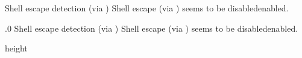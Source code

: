 %
%
%

 {Shell escape detection (via )}
Shell escape (via ) seems to be
 disabled\else enabled\fi.
\endfeature


.0 {Shell escape detection (via )}
Shell escape (via ) seems to be
\ifnum{} disabled\else enabled\fi.
\endfeature


\newpage



\pdfximage height       %
\topskip=0pt
\pdfrefximage \pdflastximage
\newpage


